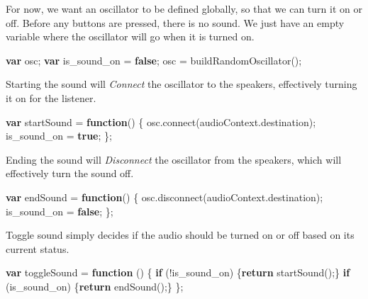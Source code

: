 \documentclass[]{article}
\newenvironment{Shaded}{}{}
\newcommand{\KeywordTok}[1]{\textbf{#1}}
\newcommand{\VariableTok}[1]{#1}
\newcommand{\ControlFlowTok}[1]{\textbf{#1}}
\newcommand{\OperatorTok}[1]{#1}
\newcommand{\AttributeTok}[1]{#1}
\newcommand{\NormalTok}[1]{#1}
\begin{document}
For now, we want an oscillator to be defined globally, so that we can
turn it on or off. Before any buttons are pressed, there is no sound. We
just have an empty variable where the oscillator will go when it is
turned on.

\begin{Shaded}
\begin{Highlighting}[]
\KeywordTok{var}\NormalTok{ osc}\OperatorTok{;}
\KeywordTok{var}\NormalTok{ is_sound_on }\OperatorTok{=} \KeywordTok{false}\OperatorTok{;}
\NormalTok{osc }\OperatorTok{=} \AttributeTok{buildRandomOscillator}\NormalTok{()}\OperatorTok{;}
\end{Highlighting}
\end{Shaded}

Starting the sound will \emph{Connect} the oscillator to the speakers,
effectively turning it on for the listener.

\begin{Shaded}
\begin{Highlighting}[]
\KeywordTok{var}\NormalTok{ startSound }\OperatorTok{=} \KeywordTok{function}\NormalTok{() }\OperatorTok{\{}
    \VariableTok{osc}\NormalTok{.}\AttributeTok{connect}\NormalTok{(}\VariableTok{audioContext}\NormalTok{.}\AttributeTok{destination}\NormalTok{)}\OperatorTok{;}
\NormalTok{    is_sound_on }\OperatorTok{=} \KeywordTok{true}\OperatorTok{;}
\OperatorTok{\};}
\end{Highlighting}
\end{Shaded}

Ending the sound will \emph{Disconnect} the oscillator from the
speakers, which will effectively turn the sound off.

\begin{Shaded}
\begin{Highlighting}[]
\KeywordTok{var}\NormalTok{ endSound }\OperatorTok{=} \KeywordTok{function}\NormalTok{() }\OperatorTok{\{}
    \VariableTok{osc}\NormalTok{.}\AttributeTok{disconnect}\NormalTok{(}\VariableTok{audioContext}\NormalTok{.}\AttributeTok{destination}\NormalTok{)}\OperatorTok{;}
\NormalTok{    is_sound_on }\OperatorTok{=} \KeywordTok{false}\OperatorTok{;}
\OperatorTok{\};}
\end{Highlighting}
\end{Shaded}

Toggle sound simply decides if the audio should be turned on or off
based on its current status.

\begin{Shaded}
\begin{Highlighting}[]
\KeywordTok{var}\NormalTok{ toggleSound }\OperatorTok{=} \KeywordTok{function}\NormalTok{ () }\OperatorTok{\{}
    \ControlFlowTok{if}\NormalTok{  (}\OperatorTok{!}\NormalTok{is_sound_on)   }\OperatorTok{\{}\ControlFlowTok{return} \AttributeTok{startSound}\NormalTok{()}\OperatorTok{;\}}
    \ControlFlowTok{if}\NormalTok{  (is_sound_on)    }\OperatorTok{\{}\ControlFlowTok{return} \AttributeTok{endSound}\NormalTok{()}\OperatorTok{;\}}
\OperatorTok{\};}
\end{Highlighting}
\end{Shaded}
\end{document}
